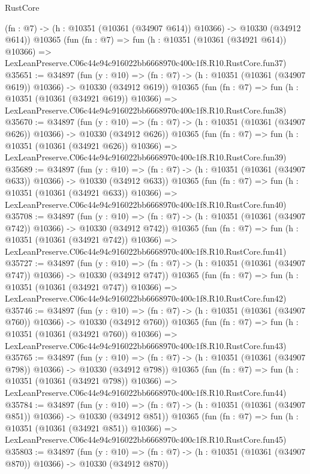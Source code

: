 \begin{lexlean}{RustCore}
\begin{coremodule}
    (fn : @7) -> (h : @10351 (@10361 (@34907 @614)) @10366) -> @10330 (@34912 @614))
    @10365
    (fun (fn : @7) =>
    fun (h : @10351 (@10361 (@34921 @614)) @10366) =>
    LexLeanPreserve.C06c44e94c916022bb6668970c400c1f8.R10.RustCore.fun37)
@35651 := @34897
    (fun (y : @10) =>
    (fn : @7) -> (h : @10351 (@10361 (@34907 @619)) @10366) -> @10330 (@34912 @619))
    @10365
    (fun (fn : @7) =>
    fun (h : @10351 (@10361 (@34921 @619)) @10366) =>
    LexLeanPreserve.C06c44e94c916022bb6668970c400c1f8.R10.RustCore.fun38)
@35670 := @34897
    (fun (y : @10) =>
    (fn : @7) -> (h : @10351 (@10361 (@34907 @626)) @10366) -> @10330 (@34912 @626))
    @10365
    (fun (fn : @7) =>
    fun (h : @10351 (@10361 (@34921 @626)) @10366) =>
    LexLeanPreserve.C06c44e94c916022bb6668970c400c1f8.R10.RustCore.fun39)
@35689 := @34897
    (fun (y : @10) =>
    (fn : @7) -> (h : @10351 (@10361 (@34907 @633)) @10366) -> @10330 (@34912 @633))
    @10365
    (fun (fn : @7) =>
    fun (h : @10351 (@10361 (@34921 @633)) @10366) =>
    LexLeanPreserve.C06c44e94c916022bb6668970c400c1f8.R10.RustCore.fun40)
@35708 := @34897
    (fun (y : @10) =>
    (fn : @7) -> (h : @10351 (@10361 (@34907 @742)) @10366) -> @10330 (@34912 @742))
    @10365
    (fun (fn : @7) =>
    fun (h : @10351 (@10361 (@34921 @742)) @10366) =>
    LexLeanPreserve.C06c44e94c916022bb6668970c400c1f8.R10.RustCore.fun41)
@35727 := @34897
    (fun (y : @10) =>
    (fn : @7) -> (h : @10351 (@10361 (@34907 @747)) @10366) -> @10330 (@34912 @747))
    @10365
    (fun (fn : @7) =>
    fun (h : @10351 (@10361 (@34921 @747)) @10366) =>
    LexLeanPreserve.C06c44e94c916022bb6668970c400c1f8.R10.RustCore.fun42)
@35746 := @34897
    (fun (y : @10) =>
    (fn : @7) -> (h : @10351 (@10361 (@34907 @760)) @10366) -> @10330 (@34912 @760))
    @10365
    (fun (fn : @7) =>
    fun (h : @10351 (@10361 (@34921 @760)) @10366) =>
    LexLeanPreserve.C06c44e94c916022bb6668970c400c1f8.R10.RustCore.fun43)
@35765 := @34897
    (fun (y : @10) =>
    (fn : @7) -> (h : @10351 (@10361 (@34907 @798)) @10366) -> @10330 (@34912 @798))
    @10365
    (fun (fn : @7) =>
    fun (h : @10351 (@10361 (@34921 @798)) @10366) =>
    LexLeanPreserve.C06c44e94c916022bb6668970c400c1f8.R10.RustCore.fun44)
@35784 := @34897
    (fun (y : @10) =>
    (fn : @7) -> (h : @10351 (@10361 (@34907 @851)) @10366) -> @10330 (@34912 @851))
    @10365
    (fun (fn : @7) =>
    fun (h : @10351 (@10361 (@34921 @851)) @10366) =>
    LexLeanPreserve.C06c44e94c916022bb6668970c400c1f8.R10.RustCore.fun45)
@35803 := @34897
    (fun (y : @10) =>
    (fn : @7) -> (h : @10351 (@10361 (@34907 @870)) @10366) -> @10330 (@34912 @870))

\end{coremodule}
\end{lexlean}
